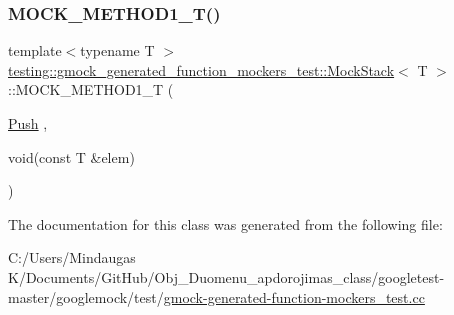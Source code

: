 \subsubsection{\texorpdfstring{MOCK\_METHOD1\_T()}{MOCK\_METHOD1\_T()}\hspace{0.1cm}{\footnotesize\ttfamily [3/3]}}
{\footnotesize\ttfamily template$<$typename T $>$ \\
\mbox{\hyperlink{classtesting_1_1gmock__generated__function__mockers__test_1_1_mock_stack}{testing\+::gmock\+\_\+generated\+\_\+function\+\_\+mockers\+\_\+test\+::\+Mock\+Stack}}$<$ T $>$\+::M\+O\+C\+K\+\_\+\+M\+E\+T\+H\+O\+D1\+\_\+T (\begin{DoxyParamCaption}\item[{\mbox{\hyperlink{classtesting_1_1gmock__generated__function__mockers__test_1_1_stack_interface_a49448f6195021fee947d37b80b6e5d30}{Push}}}]{,  }\item[{void(const T \&elem)}]{ }\end{DoxyParamCaption})}



The documentation for this class was generated from the following file\+:\begin{DoxyCompactItemize}
\item 
C\+:/\+Users/\+Mindaugas K/\+Documents/\+Git\+Hub/\+Obj\+\_\+\+Duomenu\+\_\+apdorojimas\+\_\+class/googletest-\/master/googlemock/test/\mbox{\hyperlink{googletest-master_2googlemock_2test_2gmock-generated-function-mockers__test_8cc}{gmock-\/generated-\/function-\/mockers\+\_\+test.\+cc}}\end{DoxyCompactItemize}
